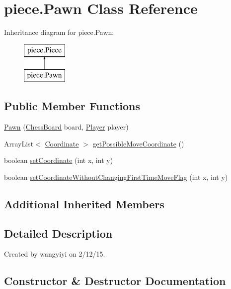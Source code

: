\hypertarget{classpiece_1_1_pawn}{}\section{piece.\+Pawn Class Reference}
\label{classpiece_1_1_pawn}
Inheritance diagram for piece.\+Pawn\+:\begin{figure}[H]
\begin{center}
\leavevmode
\includegraphics[height=2.000000cm]{classpiece_1_1_pawn}
\end{center}
\end{figure}
\subsection*{Public Member Functions}
\begin{DoxyCompactItemize}
\item 
\hyperlink{classpiece_1_1_pawn_a4f7b4f8e849019f15398ed007e89e942}{Pawn} (\hyperlink{classchess_1_1_chess_board}{Chess\+Board} board, \hyperlink{enumchess_1_1_player}{Player} player)
\item 
Array\+List$<$ \hyperlink{classpiece_1_1_coordinate}{Coordinate} $>$ \hyperlink{classpiece_1_1_pawn_aca9da51119ce8972a9897a69c3ef5033}{get\+Possible\+Move\+Coordinate} ()
\item 
boolean \hyperlink{classpiece_1_1_pawn_adaf68cbd144297f69817229018d54e36}{set\+Coordinate} (int x, int y)
\item 
boolean \hyperlink{classpiece_1_1_pawn_a266eebe5a89125e60a4eb9bb345bd16e}{set\+Coordinate\+Without\+Changing\+First\+Time\+Move\+Flag} (int x, int y)
\end{DoxyCompactItemize}
\subsection*{Additional Inherited Members}


\subsection{Detailed Description}
Created by wangyiyi on 2/12/15. 

\subsection{Constructor \& Destructor Documentation}
\hypertarget{classpiece_1_1_pawn_a4f7b4f8e849019f15398ed007e89e942}{}
